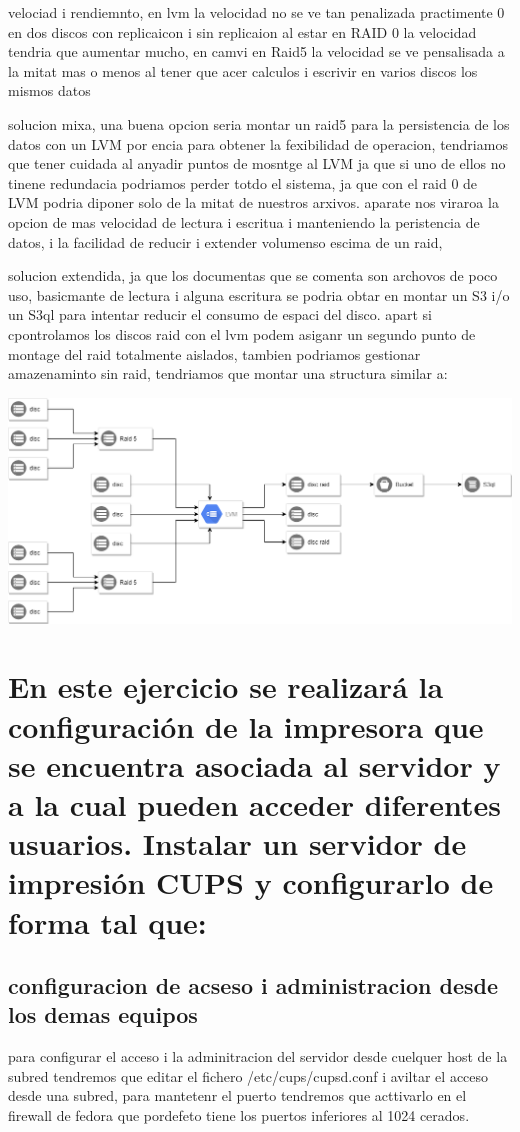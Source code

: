 \documentclass[preprint,11pt]{elsarticle}
\begin{document}
velociad i rendiemnto, en lvm la velocidad no se ve tan penalizada practimente 0 en dos discos con replicaicon i sin replicaion al estar en RAID 0 la velocidad tendria que aumentar mucho, en camvi en Raid5 la velocidad se ve pensalisada a la mitat mas o menos al tener que acer calculos i escrivir en varios discos los mismos datos

solucion mixa, una buena opcion seria montar un raid5 para la persistencia de los datos con un LVM por encia para obtener la fexibilidad de operacion, tendriamos que tener cuidada al anyadir puntos de mosntge al LVM ja que si uno de ellos no tinene redundacia podriamos perder totdo el sistema, ja que con el raid 0 de LVM podria diponer solo de la mitat de nuestros arxivos. aparate nos viraroa la opcion de mas velocidad de lectura i escritua i manteniendo la peristencia de datos, i la facilidad de reducir i extender volumenso escima de un raid, 

solucion extendida, ja que los documentas que se comenta son archovos de poco uso, basicmante de lectura i alguna escritura se podria obtar en montar un S3 i/o un S3ql para intentar reducir el consumo de espaci del disco. apart si cpontrolamos los discos raid con el lvm podem asiganr un segundo punto de montage del raid totalmente aislados, tambien podriamos gestionar amazenaminto sin raid, tendriamos que montar una structura similar a: 

\includegraphics[width=\textwidth]{structure.png}

\clearpage
\section{En este ejercicio se realizará la configuración de la impresora que se encuentra asociada al servidor y a la cual pueden acceder diferentes usuarios. Instalar un servidor de impresión CUPS y configurarlo de forma tal que:}

\subsection{configuracion de acseso i administracion desde los demas equipos}
para configurar el acceso i la adminitracion del servidor desde cuelquer host de la subred tendremos que editar el fichero /etc/cups/cupsd.conf i aviltar el acceso desde una subred, para mantetenr el puerto tendremos que acttivarlo en el firewall de fedora que pordefeto tiene los puertos inferiores al 1024 cerados.

\end{document}
